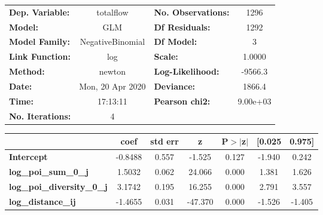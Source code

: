 \begin{center}
\begin{tabular}{lclc}
\toprule
\textbf{Dep. Variable:}            &    totalflow     & \textbf{  No. Observations:  } &     1296    \\
\textbf{Model:}                    &       GLM        & \textbf{  Df Residuals:      } &     1292    \\
\textbf{Model Family:}             & NegativeBinomial & \textbf{  Df Model:          } &        3    \\
\textbf{Link Function:}            &       log        & \textbf{  Scale:             } &    1.0000   \\
\textbf{Method:}                   &      newton      & \textbf{  Log-Likelihood:    } &   -9566.3   \\
\textbf{Date:}                     & Mon, 20 Apr 2020 & \textbf{  Deviance:          } &    1866.4   \\
\textbf{Time:}                     &     17:13:11     & \textbf{  Pearson chi2:      } &  9.00e+03   \\
\textbf{No. Iterations:}           &        4         & \textbf{                     } &             \\
\bottomrule
\end{tabular}
\begin{tabular}{lcccccc}
                                   & \textbf{coef} & \textbf{std err} & \textbf{z} & \textbf{P$> |$z$|$} & \textbf{[0.025} & \textbf{0.975]}  \\
\midrule
\textbf{Intercept}                 &      -0.8488  &        0.557     &    -1.525  &         0.127        &       -1.940    &        0.242     \\
\textbf{log\_poi\_sum\_0\_j}       &       1.5032  &        0.062     &    24.066  &         0.000        &        1.381    &        1.626     \\
\textbf{log\_poi\_diversity\_0\_j} &       3.1742  &        0.195     &    16.255  &         0.000        &        2.791    &        3.557     \\
\textbf{log\_distance\_ij}         &      -1.4655  &        0.031     &   -47.370  &         0.000        &       -1.526    &       -1.405     \\
\bottomrule
\end{tabular}
\end{center}